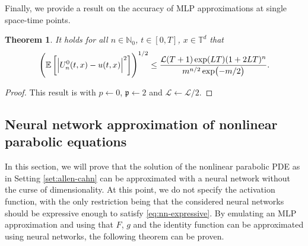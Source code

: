 \documentclass{article}
\numberwithin{equation}{section}
\newcommand{\T}{\mathbb{T}}
\newcommand{\N}{\mathbb{N}}
\newcommand{\cL}{\mathcal{L}}
\newcommand{\1}{\mathbbm{1}}
\newcommand{\E}[1]{{\mathbb{E}\left[ #1 \right]}} %
\newtheorem{theorem}{Theorem}[section]
\begin{document}
Finally, we provide a result on the accuracy of MLP approximations at single space-time points. 

\begin{theorem}\label{thm:mlp}
It holds for all $n\in\N_0$, $t\in [0,T]$, $x\in \T^d$ that
\begin{equation}
    \left(\E{\abs{U^0_n(t,x)-u(t,x)}^2}\right)^{1/2} \leq \frac{\cL (T+1)\exp(LT)(1+2LT)^n}{m^{n/2}\exp(-m/2)}. 
\end{equation}
\end{theorem}
\begin{proof}
This result is \cite[Corollary 3.15]{aj2021mlp} with $p\leftarrow 0$, $\mathfrak{p}\leftarrow 2$ and $\cL \leftarrow \cL/2$. 
\end{proof}



\subsection{Neural network approximation of nonlinear parabolic equations}\label{app:nnt-ac}

In this section, we will prove that the solution of the nonlinear parabolic PDE as in Setting \ref{set:allen-cahn} can be approximated with a neural network without the curse of dimensionality. At this point, we do not specify the activation function, with the only restriction being that the considered neural networks should be expressive enough to satisfy \eqref{eq:nn-expressive}. By emulating an MLP approximation and using that $F$, $g$ and the identity function can be approximated using neural networks, the following theorem can be proven. 
\end{document}
